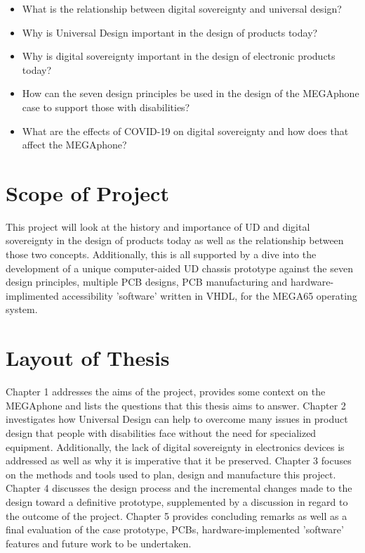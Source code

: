 \begin{itemize} 
    \item What is the relationship between digital sovereignty and universal design?
    \item Why is Universal Design important in the design of products today?
    \item Why is digital sovereignty important in the design of electronic products today?
    \item How can the seven design principles be used in the design of the MEGAphone case to support those with disabilities?
    \item What are the effects of COVID-19 on digital sovereignty and how does that affect the MEGAphone? %
    \end{itemize}


\section{Scope of Project}

This project will look at the history and importance of UD and digital sovereignty in the design of products today as well as the relationship between those two concepts. 
Additionally, this is all supported by a dive into the development of a unique computer-aided UD chassis prototype against the seven design principles\cite{sevenprinciples}, multiple PCB designs, PCB manufacturing and hardware-implimented accessibility 'software' written in VHDL, for the MEGA65 operating system.


\section{Layout of Thesis}

Chapter 1 addresses the aims of the project, provides some context on the MEGAphone and lists the questions that this thesis aims to answer.
Chapter 2 investigates how Universal Design can help to overcome many issues in product design that people with disabilities face without the need for specialized equipment. 
Additionally, the lack of digital sovereignty in electronics devices is addressed as well as why it is imperative that it be preserved.
Chapter 3 focuses on the methods and tools used to plan, design and manufacture this project.
Chapter 4 discusses the design process and the incremental changes made to the design toward a definitive prototype, supplemented by a discussion in regard to the outcome of the project. 
Chapter 5 provides concluding remarks as well as a final evaluation of the case prototype, PCBs, hardware-implemented 'software' features and future work to be undertaken.


